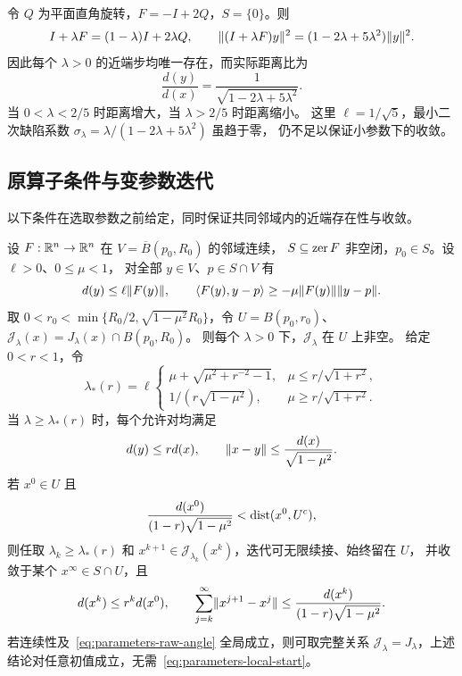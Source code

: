 \begin{example}[小参数下的距离扩张]\label{ex:parameters-rotation}
令 $Q$ 为平面直角旋转，$F=-I+2Q$，$S=\{0\}$。则
\[
 I+\lambda F=(1-\lambda)I+2\lambda Q,\qquad
 \lVert (I+\lambda F)y\rVert^2=(1-2\lambda+5\lambda^2)\lVert y\rVert^2.
\]
因此每个 $\lambda>0$ 的近端步均唯一存在，而实际距离比为
\[
 \frac{d(y)}{d(x)}=\frac1{\sqrt{1-2\lambda+5\lambda^2}}.
\]
当 $0<\lambda<2/5$ 时距离增大，当 $\lambda>2/5$ 时距离缩小。
这里 $\ell=1/\sqrt5$，最小二次缺陷系数
$\sigma_\lambda=\lambda/(1-2\lambda+5\lambda^2)$ 虽趋于零，
仍不足以保证小参数下的收敛。
\end{example}

\subsection{原算子条件与变参数迭代}

以下条件在选取参数之前给定，同时保证共同邻域内的近端存在性与收敛。

\begin{theorem}[共同参数范围与变参数收敛]\label{thm:parameters-variable}
设 $F:\mathbb R^n\to\mathbb R^n$ 在 $V=\overline B(p_0,R_0)$ 的邻域连续，
$S\subseteq\operatorname{zer} F$ 非空闭，$p_0\in S$。设 $\ell>0$、$0\le\mu<1$，
对全部 $y\in V$、$p\in S\cap V$ 有
\begin{equation}\label{eq:parameters-raw-angle}
 d(y)\le\ell\lVert F(y)\rVert,\qquad
 \langle F(y),y-p\rangle\ge-\mu\lVert F(y)\rVert\lVert y-p\rVert.
\end{equation}
取 $0<r_0<\min\{R_0/2,\sqrt{1-\mu^2}R_0\}$，令
$U=B(p_0,r_0)$、$\mathcal J_\lambda(x)=J_\lambda(x)\cap B(p_0,R_0)$。
则每个 $\lambda>0$ 下，$\mathcal J_\lambda$ 在 $U$ 上非空。
给定 $0<r<1$，令
\begin{equation}\label{eq:parameters-raw-threshold}
 \lambda_*(r)=\ell
 \begin{cases}
 \mu+\sqrt{\mu^2+r^{-2}-1},&\mu\le r/\sqrt{1+r^2},\\[3pt]
 1/(r\sqrt{1-\mu^2}),&\mu\ge r/\sqrt{1+r^2}.
 \end{cases}
\end{equation}
当 $\lambda\ge\lambda_*(r)$ 时，每个允许对均满足
\begin{equation}\label{eq:parameters-common-estimates}
 d(y)\le r d(x),\qquad \lVert x-y\rVert\le\frac{d(x)}{\sqrt{1-\mu^2}}.
\end{equation}
若 $x^0\in U$ 且
\begin{equation}\label{eq:parameters-local-start}
 \frac{d(x^0)}{(1-r)\sqrt{1-\mu^2}}<\operatorname{dist}(x^0,U^c),
\end{equation}
则任取 $\lambda_k\ge\lambda_*(r)$ 和
$x^{k+1}\in\mathcal J_{\lambda_k}(x^k)$，迭代可无限续接、始终留在 $U$，
并收敛于某个 $x^\infty\in S\cap U$，且
\begin{equation}\label{eq:parameters-variable-tail}
 d(x^k)\le r^k d(x^0),\qquad
 \sum_{j=k}^{\infty}\lVert x^{j+1}-x^j\rVert
 \le\frac{d(x^k)}{(1-r)\sqrt{1-\mu^2}}.
\end{equation}
若连续性及~\eqref{eq:parameters-raw-angle} 全局成立，则可取完整关系
$\mathcal J_\lambda=J_\lambda$，上述结论对任意初值成立，无需~\eqref{eq:parameters-local-start}。
\end{theorem}

